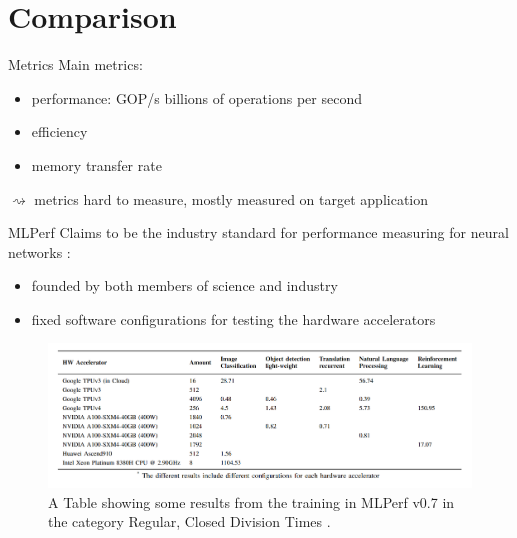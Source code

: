 \documentclass[en]{sdqbeamer}
\begin{document}
	
	\section{Comparison}
	
	\begin{frame}{Metrics}
		Main metrics:
		\begin{itemize}
			\item performance: GOP/s billions of operations per second
			\item efficiency
			\item memory transfer rate
		\end{itemize}
		$\rightsquigarrow$ metrics hard to measure, mostly measured on target application
	\end{frame}
	
	\begin{frame}{MLPerf}
		Claims to be the industry standard for performance measuring for neural networks \cite{mattson2020mlperf}:
		\begin{itemize}
			\item founded by both members of science and industry
			\item fixed software configurations for testing the hardware accelerators
		\end{itemize}	
	\end{frame}
	
	\begin{frame}
		\begin{figure}
			\centering
			\includegraphics[width= 0.95\paperwidth]{pictures/table.png}
			\caption{A Table showing some results from the training in MLPerf v0.7 in the category Regular, Closed Division Times \cite{mlperfresults}.}
		\end{figure}
	\end{frame}
	
\end{document}
